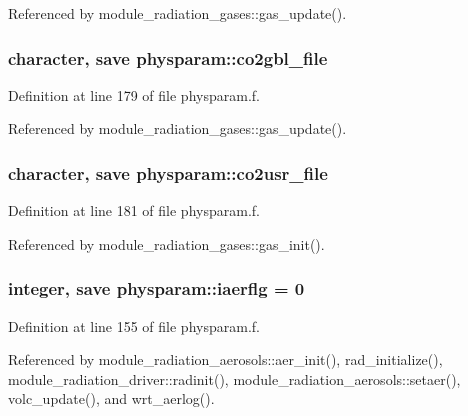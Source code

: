 Referenced by module\+\_\+radiation\+\_\+gases\+::gas\+\_\+update().

\subsubsection[{\texorpdfstring{co2gbl\+\_\+file}{co2gbl_file}}]{\setlength{\rightskip}{0pt plus 5cm}character, save physparam\+::co2gbl\+\_\+file}\hypertarget{namespacephysparam_ad3e0f053cd067945bdc816b1a81a859a}{}\label{namespacephysparam_ad3e0f053cd067945bdc816b1a81a859a}


Definition at line 179 of file physparam.\+f.



Referenced by module\+\_\+radiation\+\_\+gases\+::gas\+\_\+update().

\subsubsection[{\texorpdfstring{co2usr\+\_\+file}{co2usr_file}}]{\setlength{\rightskip}{0pt plus 5cm}character, save physparam\+::co2usr\+\_\+file}\hypertarget{namespacephysparam_a2af9769060fccf9c42e14a30cf21c0aa}{}\label{namespacephysparam_a2af9769060fccf9c42e14a30cf21c0aa}


Definition at line 181 of file physparam.\+f.



Referenced by module\+\_\+radiation\+\_\+gases\+::gas\+\_\+init().

\subsubsection[{\texorpdfstring{iaerflg}{iaerflg}}]{\setlength{\rightskip}{0pt plus 5cm}integer, save physparam\+::iaerflg = 0}\hypertarget{namespacephysparam_a2b30f07ca3fb04fbfff8c01eb8082e8d}{}\label{namespacephysparam_a2b30f07ca3fb04fbfff8c01eb8082e8d}


Definition at line 155 of file physparam.\+f.



Referenced by module\+\_\+radiation\+\_\+aerosols\+::aer\+\_\+init(), rad\+\_\+initialize(), module\+\_\+radiation\+\_\+driver\+::radinit(), module\+\_\+radiation\+\_\+aerosols\+::setaer(), volc\+\_\+update(), and wrt\+\_\+aerlog().

